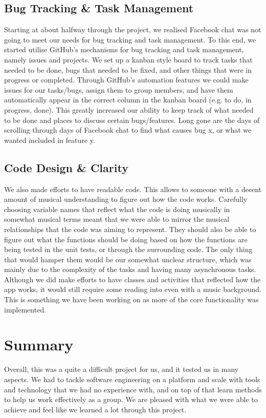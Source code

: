 \documentclass[10pt,a4paper]{article}
\begin{document}
\subsection{Bug Tracking \& Task Management}
Starting at about halfway through the project, we realised Facebook chat was not going to meet our needs for bug tracking and task management. To this end, we started utilise GitHub’s mechanisms for bug tracking and task management, namely issues and projects. We set up a kanban style board to track tasks that needed to be done, bugs that needed to be fixed, and other things that were in progress or completed. Through GitHub’s automation features we could make issues for our tasks/bugs, assign them to group members, and have them automatically appear in the correct column in the kanban board (e.g. to do, in progress, done). This greatly increased our ability to keep track of what needed to be done and places to discuss certain bugs/features. Long gone are the days of scrolling through days of Facebook chat to find what causes bug x, or what we wanted included in feature y.
\subsection{Code Design \& Clarity}
We also made efforts to have readable code. This allows to someone with a decent amount of musical understanding to figure out how the code works. Carefully choosing variable names that reflect what the code is doing musically in somewhat musical terms meant that we were able to mirror the musical relationships that the code was aiming to represent. They should also be able to figure out what the functions should be doing based on how the functions are being tested in the unit tests, or through the surrounding code. The only thing that would hamper them would be our somewhat unclear structure, which was mainly due to the complexity of the tasks and having many asynchronous tasks. Although we did make efforts to have classes and activities that reflected how the app works, it would still require some reading into even with a music background. This is something we have been working on as more of the core functionality was implemented.

\section{Summary}
Overall, this was a quite a difficult project for us, and it tested us in many aspects. We had to tackle software engineering on a platform and scale with tools and technology that we had no experience with, and on top of that learn methods to help us work effectively as a group. We are pleased with what we were able to achieve and feel like we learned a lot through this project.
\end{document}
